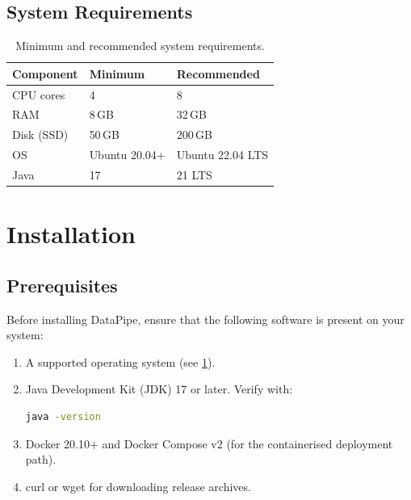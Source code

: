 \documentclass[
    language=english,
    doctype=manual,
    institution=none,
    titlestyle=book,
    oneside,
]{../../omnilatex}
\begin{document}
\section{System Requirements}

\begin{table}[htbp]
    \centering
    \caption{Minimum and recommended system requirements.}
    \label{tab:requirements}
    \begin{tabular}{@{}lll@{}}
        \toprule
        Component & Minimum & Recommended \\
        \midrule
        CPU cores & 4 & 8 \\
        RAM & 8\,GB & 32\,GB \\
        Disk (SSD) & 50\,GB & 200\,GB \\
        OS & Ubuntu 20.04+ & Ubuntu 22.04 LTS \\
        Java & 17 & 21 LTS \\
        \bottomrule
    \end{tabular}
\end{table}

\chapter{Installation}
\label{sec:installation}

\section{Prerequisites}

Before installing DataPipe, ensure that the following software is present
on your system:

\begin{enumerate}
    \item A supported operating system (see \cref{tab:requirements}).
    \item Java Development Kit (JDK) 17 or later. Verify with:
    \begin{lstlisting}[language=bash]
java -version
    \end{lstlisting}
    \item Docker 20.10+ and Docker Compose v2 (for the containerised
        deployment path).
    \item curl or wget for downloading release archives.
\end{enumerate}
\end{document}
